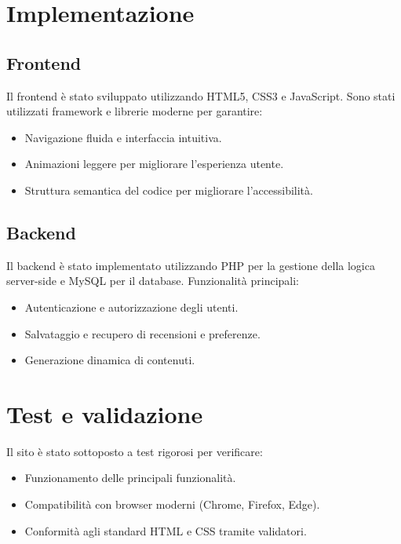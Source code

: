 \documentclass[a4paper, 12pt]{article}
\begin{document}
\begin{justify}
\section{Implementazione}

\subsection{Frontend}

Il frontend \`e stato sviluppato utilizzando HTML5, CSS3 e JavaScript. Sono stati utilizzati framework e librerie moderne per garantire:
\begin{itemize}
    \item Navigazione fluida e interfaccia intuitiva.
    \item Animazioni leggere per migliorare l'esperienza utente.
    \item Struttura semantica del codice per migliorare l'accessibilit\`a.
\end{itemize}

\subsection{Backend}
Il backend \`e stato implementato utilizzando PHP per la gestione della logica server-side e MySQL per il database. Funzionalit\`a principali:
\begin{itemize}
    \item Autenticazione e autorizzazione degli utenti.
    \item Salvataggio e recupero di recensioni e preferenze.
    \item Generazione dinamica di contenuti.
\end{itemize}

\section{Test e validazione}
Il sito \`e stato sottoposto a test rigorosi per verificare:
\begin{itemize}
    \item Funzionamento delle principali funzionalit\`a.
    \item Compatibilit\`a con browser moderni (Chrome, Firefox, Edge).
    \item Conformit\`a agli standard HTML e CSS tramite validatori.
\end{itemize}


\end{justify}
\end{document}
